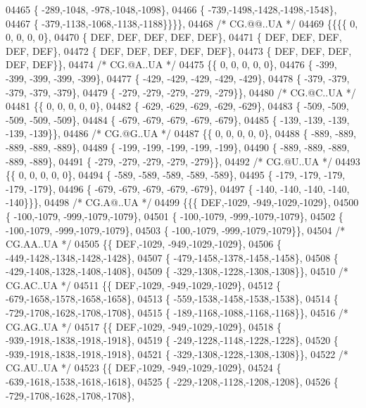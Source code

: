\begin{DoxyCode}
04465 \{ -289,-1048, -978,-1048,-1098\},
04466 \{ -739,-1498,-1428,-1498,-1548\},
04467 \{ -379,-1138,-1068,-1138,-1188\}\}\}\},
04468 \textcolor{comment}{/* CG.@@..UA */}
04469 \{\{\{\{    0,    0,    0,    0,    0\},
04470 \{  DEF,  DEF,  DEF,  DEF,  DEF\},
04471 \{  DEF,  DEF,  DEF,  DEF,  DEF\},
04472 \{  DEF,  DEF,  DEF,  DEF,  DEF\},
04473 \{  DEF,  DEF,  DEF,  DEF,  DEF\}\},
04474 \textcolor{comment}{/* CG.@A..UA */}
04475 \{\{    0,    0,    0,    0,    0\},
04476 \{ -399, -399, -399, -399, -399\},
04477 \{ -429, -429, -429, -429, -429\},
04478 \{ -379, -379, -379, -379, -379\},
04479 \{ -279, -279, -279, -279, -279\}\},
04480 \textcolor{comment}{/* CG.@C..UA */}
04481 \{\{    0,    0,    0,    0,    0\},
04482 \{ -629, -629, -629, -629, -629\},
04483 \{ -509, -509, -509, -509, -509\},
04484 \{ -679, -679, -679, -679, -679\},
04485 \{ -139, -139, -139, -139, -139\}\},
04486 \textcolor{comment}{/* CG.@G..UA */}
04487 \{\{    0,    0,    0,    0,    0\},
04488 \{ -889, -889, -889, -889, -889\},
04489 \{ -199, -199, -199, -199, -199\},
04490 \{ -889, -889, -889, -889, -889\},
04491 \{ -279, -279, -279, -279, -279\}\},
04492 \textcolor{comment}{/* CG.@U..UA */}
04493 \{\{    0,    0,    0,    0,    0\},
04494 \{ -589, -589, -589, -589, -589\},
04495 \{ -179, -179, -179, -179, -179\},
04496 \{ -679, -679, -679, -679, -679\},
04497 \{ -140, -140, -140, -140, -140\}\}\},
04498 \textcolor{comment}{/* CG.A@..UA */}
04499 \{\{\{  DEF,-1029, -949,-1029,-1029\},
04500 \{ -100,-1079, -999,-1079,-1079\},
04501 \{ -100,-1079, -999,-1079,-1079\},
04502 \{ -100,-1079, -999,-1079,-1079\},
04503 \{ -100,-1079, -999,-1079,-1079\}\},
04504 \textcolor{comment}{/* CG.AA..UA */}
04505 \{\{  DEF,-1029, -949,-1029,-1029\},
04506 \{ -449,-1428,-1348,-1428,-1428\},
04507 \{ -479,-1458,-1378,-1458,-1458\},
04508 \{ -429,-1408,-1328,-1408,-1408\},
04509 \{ -329,-1308,-1228,-1308,-1308\}\},
04510 \textcolor{comment}{/* CG.AC..UA */}
04511 \{\{  DEF,-1029, -949,-1029,-1029\},
04512 \{ -679,-1658,-1578,-1658,-1658\},
04513 \{ -559,-1538,-1458,-1538,-1538\},
04514 \{ -729,-1708,-1628,-1708,-1708\},
04515 \{ -189,-1168,-1088,-1168,-1168\}\},
04516 \textcolor{comment}{/* CG.AG..UA */}
04517 \{\{  DEF,-1029, -949,-1029,-1029\},
04518 \{ -939,-1918,-1838,-1918,-1918\},
04519 \{ -249,-1228,-1148,-1228,-1228\},
04520 \{ -939,-1918,-1838,-1918,-1918\},
04521 \{ -329,-1308,-1228,-1308,-1308\}\},
04522 \textcolor{comment}{/* CG.AU..UA */}
04523 \{\{  DEF,-1029, -949,-1029,-1029\},
04524 \{ -639,-1618,-1538,-1618,-1618\},
04525 \{ -229,-1208,-1128,-1208,-1208\},
04526 \{ -729,-1708,-1628,-1708,-1708\},

\end{DoxyCode}
